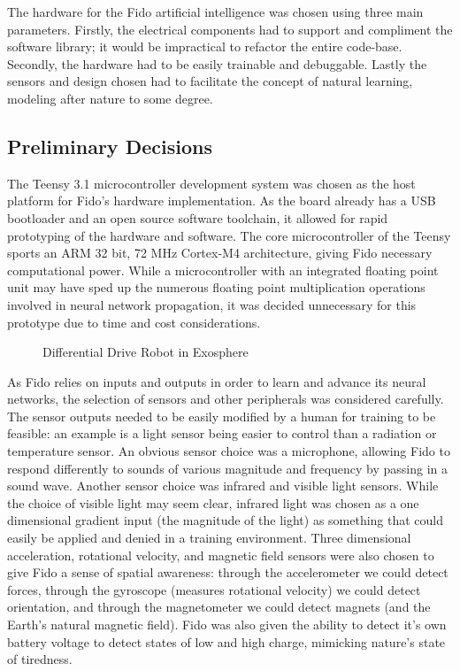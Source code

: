 The hardware for the Fido artificial intelligence was chosen using three main parameters.  Firstly, the electrical components had to support and compliment the software library; it would be impractical to refactor the entire code-base.  Secondly, the hardware had to be easily trainable and debuggable.  Lastly the sensors and design chosen had to facilitate the concept of natural learning, modeling after nature to some degree.

\subsection{Preliminary Decisions}

The Teensy 3.1 microcontroller development system was chosen as the host platform for Fido's hardware implementation.  As the board already has a USB bootloader and an open source software toolchain, it allowed for rapid prototyping of the hardware and software.  The core microcontroller of the Teensy sports an ARM 32 bit, 72 MHz Cortex-M4 architecture, giving Fido necessary computational power.  While a microcontroller with an integrated floating point unit may have sped up the numerous floating point multiplication operations involved in neural network propagation, it was decided unnecessary for this prototype due to time and cost considerations.

\begin{figure}[ht]
	\centering
	\scalebox{.6}{}
	\caption{Differential Drive Robot in Exosphere}
\end{figure}

As Fido relies on inputs and outputs in order to learn and advance its neural networks, the selection of sensors and other peripherals was considered carefully.  The sensor outputs needed to be easily modified by a human for training to be feasible: an example is a light sensor being easier to control than a radiation or temperature sensor.  An obvious sensor choice was a microphone, allowing Fido to respond differently to sounds of various magnitude and frequency by passing in a sound wave.  Another sensor choice was infrared and visible light sensors.  While the choice of visible light may seem clear, infrared light was chosen as a one dimensional gradient input (the magnitude of the light) as something that could easily be applied and denied in a training environment.  Three dimensional acceleration, rotational velocity, and magnetic field sensors were also chosen to give Fido a sense of spatial awareness: through the accelerometer we could detect forces, through the gyroscope (measures rotational velocity) we could detect orientation, and through the magnetometer we could detect magnets (and the Earth's natural magnetic field).  Fido was also given the ability to detect it's own battery voltage to detect states of low and high charge, mimicking nature's state of tiredness.

